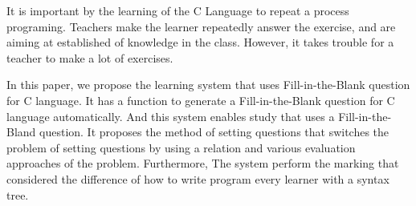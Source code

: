\setlength{\baselineskip}{2\baselineskip}
\eabstract

It is important by the learning of the C Language to repeat a process programing.
Teachers make the learner repeatedly answer the exercise, and are aiming at established of knowledge in the class. 
However, it takes trouble for a teacher to make a lot of exercises.

In this paper, we propose the learning system that uses Fill-in-the-Blank question for C language.
It has a function to generate a Fill-in-the-Blank question for C language automatically. 
And this system enables study that uses a Fill-in-the-Bland question. 
It proposes the method of setting questions that switches the problem of setting questions
 by using a relation and various evaluation approaches of the problem.
Furthermore, The system perform the marking that considered the difference of how to write program every learner with a syntax tree.

\setlength{\baselineskip}{0.5\baselineskip}
